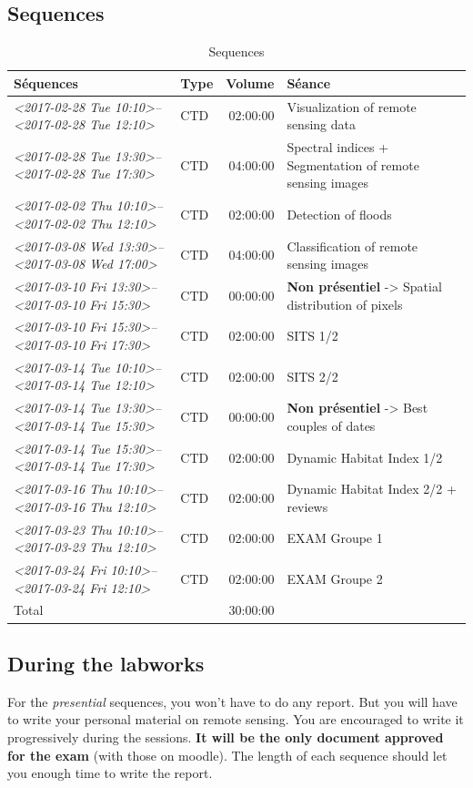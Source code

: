 \documentclass[a4paper,11pt,DIV=18]{scrartcl}
\begin{document}
\subsection{Sequences}
\label{sec:org187ab75}
\begin{table}[htbp]
\caption{Sequences}
\centering
\begin{tabular}{llrl}
\toprule
Séquences & Type & Volume & Séance\\
\midrule
\textit{<2017-02-28 Tue 10:10>--<2017-02-28 Tue 12:10>} & CTD & 02:00:00 & Visualization of remote sensing data\\
\textit{<2017-02-28 Tue 13:30>--<2017-02-28 Tue 17:30>} & CTD & 04:00:00 & Spectral indices + Segmentation of remote sensing images\\
\textit{<2017-02-02 Thu 10:10>--<2017-02-02 Thu 12:10>} & CTD & 02:00:00 & Detection of floods\\
\textit{<2017-03-08 Wed 13:30>--<2017-03-08 Wed 17:00>} & CTD & 04:00:00 & Classification of remote sensing images\\
\textit{<2017-03-10 Fri 13:30>--<2017-03-10 Fri 15:30>} & CTD & 00:00:00 & \textbf{Non présentiel} -> Spatial distribution of pixels\\
\textit{<2017-03-10 Fri 15:30>--<2017-03-10 Fri 17:30>} & CTD & 02:00:00 & SITS 1/2\\
\textit{<2017-03-14 Tue 10:10>--<2017-03-14 Tue 12:10>} & CTD & 02:00:00 & SITS 2/2\\
\textit{<2017-03-14 Tue 13:30>--<2017-03-14 Tue 15:30>} & CTD & 00:00:00 & \textbf{Non présentiel} -> Best couples of dates\\
\textit{<2017-03-14 Tue 15:30>--<2017-03-14 Tue 17:30>} & CTD & 02:00:00 & Dynamic Habitat Index 1/2\\
\textit{<2017-03-16 Thu 10:10>--<2017-03-16 Thu 12:10>} & CTD & 02:00:00 & Dynamic Habitat Index 2/2 + reviews\\
\textit{<2017-03-23 Thu 10:10>--<2017-03-23 Thu 12:10>} & CTD & 02:00:00 & EXAM Groupe 1\\
\textit{<2017-03-24 Fri 10:10>--<2017-03-24 Fri 12:10>} & CTD & 02:00:00 & EXAM Groupe 2\\
\midrule
Total &  & 30:00:00 & \\
\bottomrule
\end{tabular}
\end{table}

\subsection{During the labworks}
\label{sec:org385eb6a}
For the \emph{presential} sequences, you won't have to do any report. But you
will have to  write your personal material on remote  sensing. You are
encouraged to write it progressively  during the sessions.  \textbf{It will be
the only  document approved for the  exam} (with those on  moodle). The
length  of each  sequence  should let  you enough  time  to write  the
report.
\end{document}
